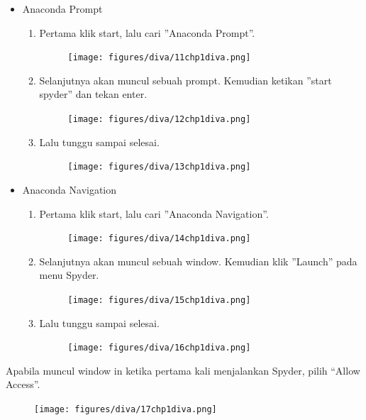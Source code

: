 \begin{itemize}
	\item Anaconda Prompt

	\begin{enumerate}
		
		\item Pertama klik start, lalu cari ''Anaconda Prompt''.
		\begin{figure}[H]
			\texttt{[image: figures/diva/11chp1diva.png]}
			\centering
		\end{figure}		
		\item Selanjutnya akan muncul sebuah prompt. Kemudian ketikan ''start spyder'' dan tekan enter.
		\begin{figure}[H]
			\texttt{[image: figures/diva/12chp1diva.png]}
			\centering
		\end{figure}
		\item Lalu tunggu sampai selesai.
		\begin{figure}[H]
			\texttt{[image: figures/diva/13chp1diva.png]}
			\centering
		\end{figure}

	\end{enumerate}
	\item Anaconda Navigation

	\begin{enumerate}
		\item Pertama klik start, lalu cari ''Anaconda Navigation''.
		\begin{figure}[H]
			\texttt{[image: figures/diva/14chp1diva.png]}
			\centering
		\end{figure}
		\item Selanjutnya akan muncul sebuah window. Kemudian klik ''Launch'' pada menu Spyder.
		\begin{figure}[H]
			\texttt{[image: figures/diva/15chp1diva.png]}
			\centering
		\end{figure}
		\item Lalu tunggu sampai selesai.
		\begin{figure}[H]
			\texttt{[image: figures/diva/16chp1diva.png]}
			\centering
		\end{figure}

	\end{enumerate}
\end{itemize}

Apabila muncul window in ketika pertama kali menjalankan Spyder, pilih “Allow Access”.
\begin{figure}[H]
	\texttt{[image: figures/diva/17chp1diva.png]}
	\centering
\end{figure}
		

